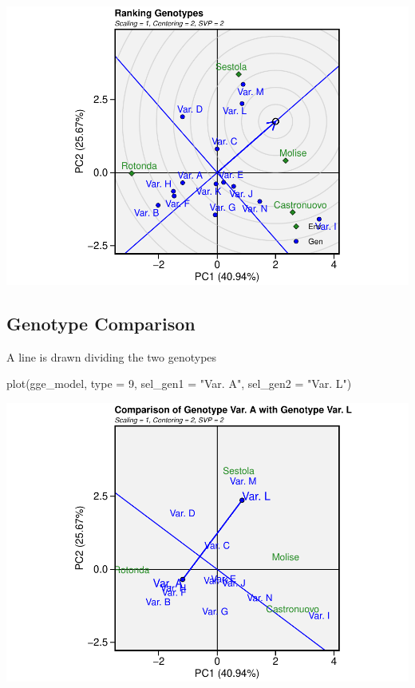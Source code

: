 \documentclass[
]{book}
\newenvironment{Shaded}{\begin{snugshade}}{\end{snugshade}}
\newcommand{\AttributeTok}[1]{\textcolor[rgb]{0.77,0.63,0.00}{#1}}
\newcommand{\DecValTok}[1]{\textcolor[rgb]{0.00,0.00,0.81}{#1}}
\newcommand{\FunctionTok}[1]{\textcolor[rgb]{0.00,0.00,0.00}{#1}}
\newcommand{\NormalTok}[1]{#1}
\newcommand{\StringTok}[1]{\textcolor[rgb]{0.31,0.60,0.02}{#1}}
\begin{document}
\includegraphics{PPB-Toolkit-for-R-and-R-Studio_files/figure-latex/unnamed-chunk-129-1.pdf}

\hypertarget{genotype-comparison}{%
\subsection{Genotype Comparison}\label{genotype-comparison}}

A line is drawn dividing the two genotypes

\begin{Shaded}
\begin{Highlighting}[]
\FunctionTok{plot}\NormalTok{(gge\_model,}
     \AttributeTok{type =} \DecValTok{9}\NormalTok{,}
     \AttributeTok{sel\_gen1 =} \StringTok{"Var. A"}\NormalTok{,}
     \AttributeTok{sel\_gen2 =} \StringTok{"Var. L"}\NormalTok{)}
\end{Highlighting}
\end{Shaded}

\includegraphics{PPB-Toolkit-for-R-and-R-Studio_files/figure-latex/unnamed-chunk-130-1.pdf}
\end{document}

